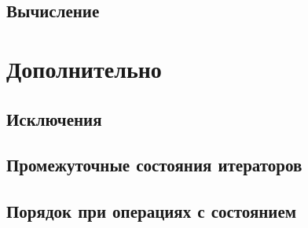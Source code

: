 \subsection{Вычисление}



\section{Дополнительно}

\subsection{Исключения}


\subsection{Промежуточные состояния итераторов}



\subsection{Порядок при операциях с состоянием}




